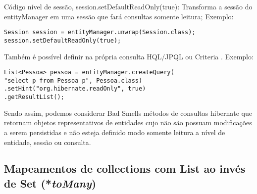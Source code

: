 Código nível de sessão, session.setDefaultReadOnly(true):
Transforma a sessão do entityManager em uma sessão que fará consultas somente leitura; Exemplo:

\begin{scriptsize}
\estiloJava
\begin{lstlisting}[caption={Definição somente-leitura na sessão}, label=lst:javacode]
Session session = entityManager.unwrap(Session.class);
session.setDefaultReadOnly(true);
\end{lstlisting}
\end{scriptsize}


Também é possível definir na própria consulta HQL/JPQL ou Criteria %
. Exemplo:

\begin{scriptsize}
\estiloJava
\begin{lstlisting}[caption={Definição somente-leitura na consulta},label=lst:javacode]
List<Pessoa> pessoa = entityManager.createQuery(
"select p from Pessoa p", Pessoa.class)
.setHint("org.hibernate.readOnly", true)
.getResultList();
\end{lstlisting}
\end{scriptsize}


Sendo assim, podemos considerar Bad Smells métodos de consultas hibernate que retornam objetos representativos de entidades cujo não são possuam modificações a serem persistidas e não esteja definido modo somente leitura a nível de entidade, sessão ou consulta.

\subsection{Mapeamentos de collections com List ao invés de Set (*\textit{toMany})}


